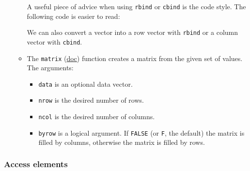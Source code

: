 \documentclass[a4paper]{article}
\begin{document}
\begin{itemize}
\begin{itemize}
            A useful piece of advice when using \texttt{rbind} or \texttt{cbind} is the code style. The following code is easier to read:
            
            We can also convert a vector into a row vector with \texttt{rbind} or a column vector with \texttt{cbind}.

            \item The \texttt{matrix} (\href{https://www.rdocumentation.org/packages/base/versions/3.6.2/topics/matrix}{doc}) function creates a matrix from the given set of values. The arguments:
            \begin{itemize}
                \item \texttt{data} is an optional data vector.
                \item \texttt{nrow} is the desired number of rows.
                \item \texttt{ncol} is the desired number of columns.
                \item \texttt{byrow} is a logical argument. If \texttt{FALSE} (or \texttt{F}, the default) the matrix is filled by columns, otherwise the matrix is filled by rows.
            \end{itemize}
            
        \end{itemize}
    \end{itemize}

    \subsubsection{Access elements}
\end{document}
